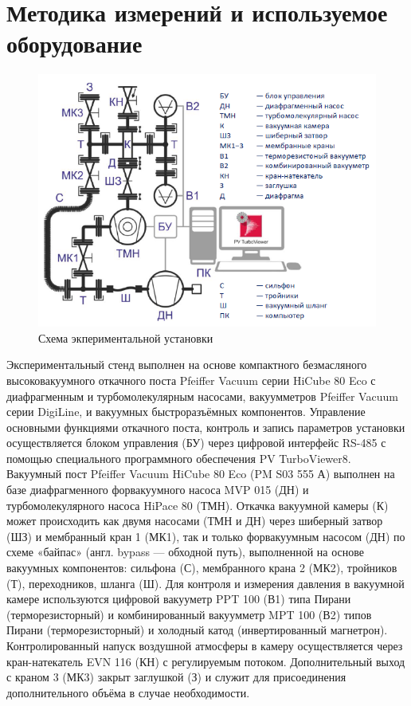 \documentclass[a4paper, 12pt]{article}
\begin{document}
    \section*{Методика измерений и используемое оборудование}
        \begin{figure}[H]
            \centering
            \includegraphics[width = \textwidth]{images/231_1.png}
            \caption{Схема экпериментальной установки}
        \end{figure}
        
        Экспериментальный стенд выполнен на основе компактного безмасляного высоковакуумного откачного поста Pfeiffer Vacuum серии HiCube 80 Eco с диафрагменным и турбомолекулярным насосами, вакуумметров Pfeiffer Vacuum серии DigiLine, и вакуумных быстроразъёмных компонентов. Управление основными функциями откачного поста, контроль и запись параметров установки осуществляется блоком управления (БУ) через цифровой интерфейс RS-485 с помощью специального программного обеспечения PV TurboViewer8.
        Вакуумный пост Pfeiffer Vacuum HiCube 80 Eco (PM S03 555 А) выполнен на базе диафрагменного форвакуумного насоса MVP 015 (ДН) и турбомолекулярного насоса HiPace 80 (ТМН). Откачка вакуумной камеры (К) может происходить как двумя насосами (ТМН и ДН) через шиберный затвор (ШЗ) и мембранный кран 1 (МК1), так и только форвакуумным насосом (ДН) по схеме «байпас» (англ. bypass — обходной путь), выполненной на основе вакуумных компонентов: сильфона (С), мембранного крана 2 (МК2), тройников (Т), переходников, шланга (Ш). Для контроля и измерения давления в вакуумной камере используются цифровой вакууметр PPT 100 (В1) типа Пирани (терморезисторный) и комбинированный вакуумметр MPT 100 (В2) типов Пирани (терморезисторный) и холодный катод (инвертированный магнетрон). Контролированный напуск воздушной атмосферы в камеру осуществляется через кран-натекатель EVN 116 (КН) с регулируемым потоком. Дополнительный выход с краном 3 (МК3) закрыт заглушкой (З) и служит для присоединения дополнительного объёма в случае необходимости.
\end{document}
